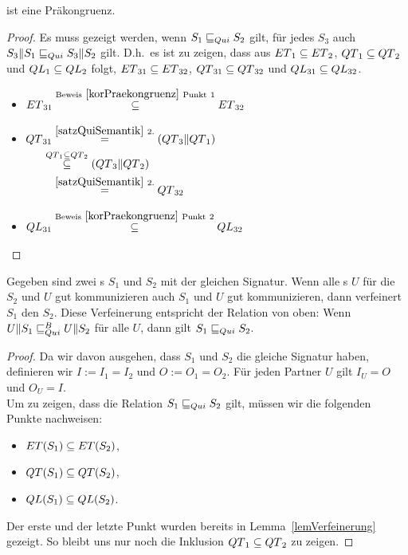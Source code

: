 \begin{prop}[Präkongruenz]
  \QRel{} ist eine Präkongruenz.
\end{prop}

\begin{proof}
  Es muss gezeigt werden, wenn $S_1\sqsubseteq _{Qui} S_2$ gilt,  für   jedes $
  S_3$ auch $S_3\|S_1\sqsubseteq _{Qui} S_3\|S_2$ gilt. D.h.\ es ist zu zeigen,
  dass aus $ET{}_1\subseteq ET{}_2$, $QT{}_1\subseteq QT{}_2$ und $QL{}_1\subseteq QL{}_2$
  folgt, $ET{}_{31}\subseteq ET{}_{32}$, $QT{}_{31}\subseteq QT{}_{32}$ und
  $QL{}_{31}\subseteq QL{}_{32}$.
  \begin{itemize}
    \item $\begin{aligned}[t]
        ET{}_{31} \overset{\mathrm{Beweis}~\ref{korPraekongruenz}
        ~\mathrm{Punkt}~1}{\subseteq} ET{}_{32}
    \end{aligned}$
    \item $\begin{aligned}[t]
        \QT{}_{31} &\overset{\ref{satzQuiSemantik}~2.}{=} (\QT{}_3\|\QT{}_1)\\
                &\hspace{-0.3cm}\overset{\QT{}_1\subseteq \QT{}_2}{\subseteq} (\QT{}_3\|\QT{}_2)\\
                &\overset{\ref{satzQuiSemantik}~2.}{=} \QT{}_{32}
    \end{aligned}$
    \item $\begin{aligned}[t]
        QL{}_{31} \overset{\mathrm{Beweis}~\ref{korPraekongruenz}
        ~\mathrm{Punkt}~2}{\subseteq} QL{}_{32}
    \end{aligned}$
  \end{itemize}
\end{proof}

\begin{lem}
  Gegeben sind zwei \EIO{}s $S_1$ und $S_2$ mit der gleichen Signatur. Wenn alle
  \EIO{}s $U$ für die $S_2$ und $U$ gut kommunizieren auch $S_1$ und $U$ gut
  kommunizieren, dann verfeinert $S_1$ den \EIO{} $S_2$. Diese Verfeinerung
  entspricht der Relation \QRel{} von oben: Wenn
  $U\|S_1\sqsubseteq _{Qui}^B U\|S_2$ für alle $U$, dann gilt $S_1\sqsubseteq _{Qui} S_2$.
\end{lem}

\begin{proof}
  Da wir davon ausgehen, dass $S_1$ und $S_2$ die gleiche Signatur haben,
  definieren wir $I:=I_1=I_2$ und $O:=O_1=O_2$. Für jeden Partner $U$ gilt
  $I_U=O$ und $O_U=I$.\\
  Um zu zeigen, dass die Relation $S_1\sqsubseteq _{Qui} S_2$ gilt, müssen wir die
  folgenden Punkte nachweisen:
  \begin{itemize}
    \item $ET{}(S_1)\subseteq ET{}(S_2)$,
    \item $QT{}(S_1)\subseteq QT{}(S_2)$,
    \item $QL{}(S_1)\subseteq QL{}(S_2)$.
  \end{itemize}
  Der erste und der letzte Punkt wurden bereits in Lemma~\ref{lemVerfeinerung}
  gezeigt. So bleibt uns nur noch die Inklusion $QT{}_1\subseteq QT{}_2$ zu zeigen.
\end{proof}
